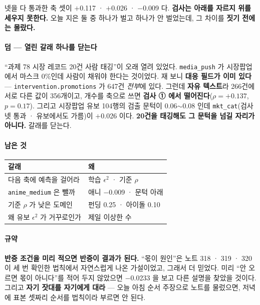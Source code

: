 \documentclass[10pt]{article}
\begin{document}
넷을 다 통과한 축 셋이 $+$0.117 · $+$0.026 · $-$0.009 다. \textbf{검사는
아래를 자르지 위를 세우지 못한다.} 오늘 지은 둘 중 하나가 벌고 하나가
안 벌었는데, 그 차이를 \textbf{짓기 전에는 몰랐다.}

\paragraph{덤 --- 열린 갈래 하나를 닫는다} ``과제 78 시장 레코드 20건 사람
태깅''이 오래 열려 있었다. \texttt{media\_push} 가 시장팝업에서 마스크
0\%인데 사람이 채워야 한다는 것이었다. 재 보니 \textbf{대응 필드가 이미
있다} --- \texttt{intervention.promotions} 가 647건 \emph{전부}에 있다.
그런데 \textbf{자유 텍스트}라 266건에 서로 다른 값이 356개이고, 개수를
축으로 쓰면 \textbf{검사 ① 에서 떨어진다}($\rho{=}{+}0.137$, $p{=}0.17$).
그리고 시장팝업 유보 104행의 검출 문턱이 0.06$\sim$0.08 인데
\texttt{mkt\_cat}(검사 넷 통과 · 유보에서도 가름)이 $+$0.026 이다.
\textbf{20건을 태깅해도 그 문턱을 넘길 자리가 아니다.} 갈래를 닫는다.

\paragraph{남은 것}
\begin{center}\small
\begin{tabular}{ll}
\hline
갈래 & 왜 \\
\hline
다음 축에 예측을 걸어라 & 학습 $\epsilon^2$ · 기준 $\rho$ \\
\texttt{anime\_medium} 은 뺄까 & 애니 $-$0.009 · 문턱 아래 \\
기준 $\rho$ 가 낮은 도메인 & 펀딩 0.25 · 아이돌 0.10 \\
왜 유보 $\epsilon^2$ 가 거꾸로인가 & 제일 이상한 수 \\
\hline
\end{tabular}
\end{center}

\paragraph{규약} \textbf{반증 조건을 미리 적으면 반증이 결과가 된다.}
``몫이 원인''은 노트 318 · 319 · 320이 세 번 확인한 법칙에서 자연스럽게
나온 가설이었고, 그래서 더 믿었다. 미리 ``안 오르면 몫이 아니다''를
적어 두지 않았으면 $-$0.0233 을 보고 다른 설명을 찾았을 것이다.
그리고 \textbf{자기 잣대를 자기에게 대라} --- 오늘 아침 순서 주장으로 노트를
물렀으면, 저녁에 표본 셋짜리 순서를 법칙이라 부르면 안 된다.
\end{document}
